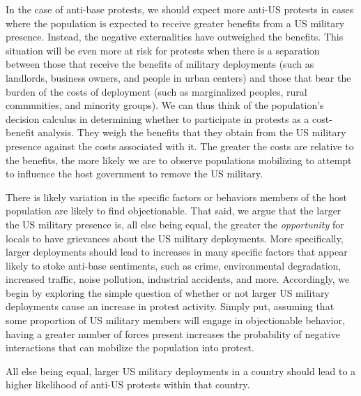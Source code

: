 		In the case of anti-base protests, we should expect more anti-US protests in cases where the population is expected to receive greater benefits from a US military presence. Instead, the negative externalities have outweighed the benefits. This situation will be even more at risk for protests when there is a separation between those that receive the benefits of military deployments (such as landlords, business owners, and people in urban centers) and those that bear the burden of the costs of deployment (such as marginalized peoples, rural communities, and minority groups). We can thus think of the population's decision calculus in determining whether to participate in protests as a cost-benefit analysis. They weigh the benefits that they obtain from the US military presence against the costs associated with it. The greater the costs are relative to the benefits, the more likely we are to observe populations mobilizing to attempt to influence the host government to remove the US military. 
		
		There is likely variation in the specific factors or behaviors members of the host population are likely to find objectionable. That said, we argue that the larger the US military presence is, all else being equal, the greater the \textit{opportunity} for locals to have grievances about the US military deployments. More specifically, larger deployments should lead to increases in many specific factors that appear likely to stoke anti-base sentiments, such as crime, environmental degradation, increased traffic, noise pollution, industrial accidents, and more. Accordingly, we begin by exploring the simple question of whether or not larger US military deployments cause an increase in protest activity. Simply put, assuming that some proportion of US military members will engage in objectionable behavior, having a greater number of forces present increases the probability of negative interactions that can mobilize the population into protest.\cite{allenandflynn2013}
		
		\begin{hyp}
			All else being equal, larger US military deployments in a country should lead to a higher likelihood of anti-US protests within that country.
		\end{hyp}
		
